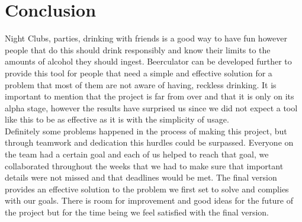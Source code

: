 \section{Conclusion}
\label{sec:conclusion}
Night Clubs, parties, drinking with friends is a good way to have fun however people that do this should drink responsibly and know their limits to the amounts of alcohol they should ingest. Beerculator can be developed further to provide this tool for people that need a simple and effective solution for a problem that most of them are not aware of having, reckless drinking. It is important to mention that the project is far from over and that it is only on its alpha stage, however the results have surprised us since we did not expect a tool like this to be as effective as it is with the simplicity of usage.\\

Definitely some problems happened in the process of making this project, but through teamwork and dedication this hurdles could be surpassed. Everyone on the team had a certain goal and each of us helped to reach that goal, we collaborated throughout the weeks that we had to make sure that important details were not missed and that deadlines would be met. The final version provides an effective solution to the problem we first set to solve and complies with our goals. There is room for improvement and good ideas for the future of the project but for the time being we feel satisfied with the final version.\\   